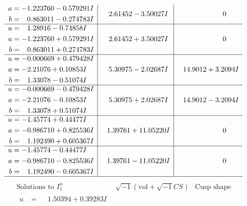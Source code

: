 \documentclass[1p]{elsarticle_modified}
\theoremstyle{definition}
\newcommand{\I}{\sqrt{-1}}
\begin{document}
$$\begin{array}{c|c|c}
\begin{aligned}
a &= -1.223760 - 0.579291 I \\
b &= \phantom{-}0.863011 - 0.274783 I\end{aligned}
 & \phantom{-}2.61452 - 3.50027 I & \phantom{-0.000000 } 0 \\ \hline\begin{aligned}
u &= \phantom{-}1.28916 - 0.74858 I \\
a &= -1.223760 + 0.579291 I \\
b &= \phantom{-}0.863011 + 0.274783 I\end{aligned}
 & \phantom{-}2.61452 + 3.50027 I & \phantom{-0.000000 } 0 \\ \hline\begin{aligned}
u &= -0.000669 + 0.479428 I \\
a &= -2.21076 + 0.10853 I \\
b &= \phantom{-}1.33078 - 0.51074 I\end{aligned}
 & \phantom{-}5.30975 - 2.02687 I & \phantom{-}14.9012 + 3.2094 I \\ \hline\begin{aligned}
u &= -0.000669 - 0.479428 I \\
a &= -2.21076 - 0.10853 I \\
b &= \phantom{-}1.33078 + 0.51074 I\end{aligned}
 & \phantom{-}5.30975 + 2.02687 I & \phantom{-}14.9012 - 3.2094 I \\ \hline\begin{aligned}
u &= -1.45774 + 0.44477 I \\
a &= -0.986710 + 0.825536 I \\
b &= \phantom{-}1.192490 + 0.605367 I\end{aligned}
 & \phantom{-}1.39761 + 11.05220 I & \phantom{-0.000000 } 0 \\ \hline\begin{aligned}
u &= -1.45774 - 0.44477 I \\
a &= -0.986710 - 0.825536 I \\
b &= \phantom{-}1.192490 - 0.605367 I\end{aligned}
 & \phantom{-}1.39761 - 11.05220 I & \phantom{-0.000000 } 0\\
 \hline 
 \end{array}$$\newpage$$\begin{array}{c|c|c}  
\text{Solutions to }I^u_{1}& \I (\text{vol} + \sqrt{-1}CS) & \text{Cusp shape}\\
 \hline 
\begin{aligned}
u &= \phantom{-}1.50394 + 0.39283 I \\

\end{aligned}
\end{array}$$
\end{document}
